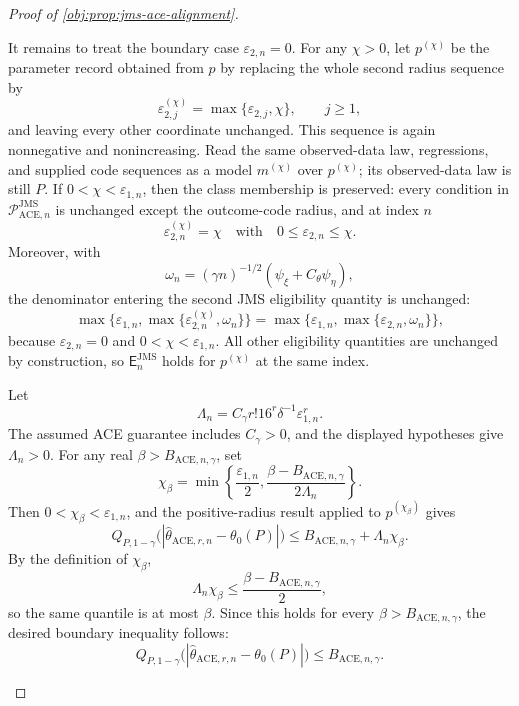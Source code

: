 \begin{proof}[Proof of \cref{obj:prop:jms-ace-alignment}]
\begin{enumerate}
It remains to treat the boundary case \(\varepsilon_{2,n}=0\).  For any
\(\chi>0\), let \(p^{(\chi)}\) be the parameter record obtained from \(p\) by
replacing the whole second radius sequence by
\[
  \varepsilon_{2,j}^{(\chi)}=\max\{\varepsilon_{2,j},\chi\},
  \qquad j\ge1,
\]
and leaving every other coordinate unchanged.  This sequence is again
nonnegative and nonincreasing.  Read the same observed-data law, regressions,
and supplied code sequences as a model \(m^{(\chi)}\) over \(p^{(\chi)}\); its
observed-data law is still \(P\).  If \(0<\chi<\varepsilon_{1,n}\), then the
class membership is preserved: every condition in
\(\mathcal P_{\mathrm{ACE},n}^{\mathrm{JMS}}\) is unchanged except the
outcome-code radius, and at index \(n\)
\[
  \varepsilon_{2,n}^{(\chi)}=\chi
  \quad\text{with}\quad
  0\le \varepsilon_{2,n}\le \chi .
\]
Moreover, with
\[
  \omega_n=(\gamma n)^{-1/2}(\psi_{\xi}+C_{\theta}\psi_{\eta}),
\]
the denominator entering the second JMS eligibility quantity is unchanged:
\[
 \max\{\varepsilon_{1,n},\max\{\varepsilon_{2,n}^{(\chi)},\omega_n\}\}
 =
 \max\{\varepsilon_{1,n},\max\{\varepsilon_{2,n},\omega_n\}\},
\]
because \(\varepsilon_{2,n}=0\) and \(0<\chi<\varepsilon_{1,n}\).  All other
eligibility quantities are unchanged by construction, so
\(\mathsf E_n^{\mathrm{JMS}}\) holds for \(p^{(\chi)}\) at the same index.

Let
\[
  \Lambda_n
  =
  C_{\gamma} r!16^r\delta^{-1}\varepsilon_{1,n}^r .
\]
The assumed ACE guarantee includes \(C_{\gamma}>0\), and the displayed hypotheses
give \(\Lambda_n>0\).  For any real \(\beta>B_{\mathrm{ACE},n,\gamma}\), set
\[
  \chi_{\beta}
  =
  \min\!\left\{
    \frac{\varepsilon_{1,n}}{2},
    \frac{\beta-B_{\mathrm{ACE},n,\gamma}}{2\Lambda_n}
  \right\}.
\]
Then \(0<\chi_{\beta}<\varepsilon_{1,n}\), and the positive-radius result
applied to \(p^{(\chi_{\beta})}\) gives
\[
 Q_{P,1-\gamma}
 \bigl(|\widehat\theta_{\mathrm{ACE},r,n}-\theta_0(P)|\bigr)
 \le
 B_{\mathrm{ACE},n,\gamma}+\Lambda_n\chi_{\beta}.
\]
By the definition of \(\chi_{\beta}\),
\[
  \Lambda_n\chi_{\beta}
  \le
  \frac{\beta-B_{\mathrm{ACE},n,\gamma}}{2},
\]
so the same quantile is at most \(\beta\).  Since this holds for every
\(\beta>B_{\mathrm{ACE},n,\gamma}\), the desired boundary inequality follows:
\[
 Q_{P,1-\gamma}
 \bigl(|\widehat\theta_{\mathrm{ACE},r,n}-\theta_0(P)|\bigr)
 \le B_{\mathrm{ACE},n,\gamma}.
\]


\end{enumerate}
\end{proof}

